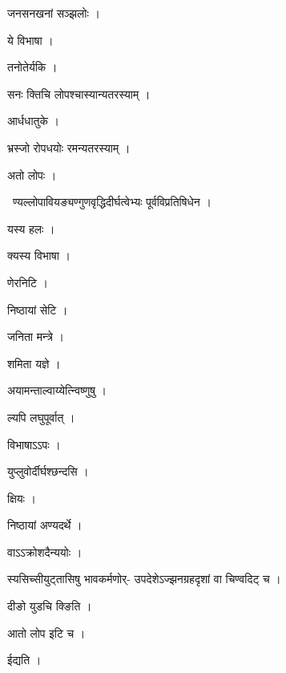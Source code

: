 \documentclass[10pt, openany, oneside]{book}
\begin{document}
\noindent जनसनखनां सञ्झलोः ।

\noindent ये विभाषा ।

\noindent तनोतेर्यकि ।

\noindent सनः क्तिचि लोपश्चास्यान्यतरस्याम् ।

\noindent आर्धधातुके ।

\noindent भ्रस्जो रोपधयोः रमन्यतरस्याम् ।

\noindent अतो लोपः ।

\par\noindent\hspace{1.5em}{\vps वा॰}~{\qt ण्यल्लोपावियङ्यण्गुणवृद्धिदीर्घत्वेभ्यः पूर्वविप्रतिषिधेन ।}

\noindent यस्य हलः ।

\noindent क्यस्य विभाषा ।

\noindent णेरनिटि ।

\noindent निष्ठायां सेटि ।

\noindent जनिता मन्त्रे ।

\noindent शमिता यज्ञे ।

\noindent अयामन्ताल्वाय्येत्न्विष्णुषु ।

\noindent ल्यपि लघुपूर्वात् ।

\noindent विभाषाऽऽपः ।

\noindent युप्लुवोर्दीर्घश्छन्दसि ।

\noindent क्षियः ।

\noindent निष्ठायां अण्यदर्थे ।

\noindent वाऽऽक्रोशदैन्ययोः ।

\noindent स्यसिच्सीयुट्तासिषु भावकर्मणोर्- उपदेशेऽज्झनग्रहदृशां वा चिण्वदिट् च ।

\noindent दीङो युडचि क्ङिति ।

\noindent आतो लोप इटि च ।

\noindent ईद्यति ।
\end{document}

